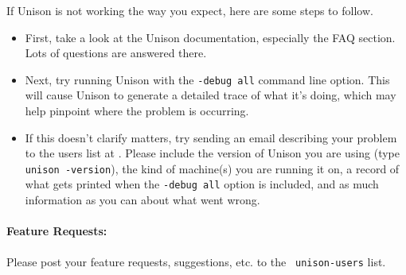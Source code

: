 If Unison is not working the way you expect, here are some steps to 
follow.
\begin{itemize}
\item First, take a look at the Unison documentation, especially the
FAQ section.  Lots of questions are answered there.

\item Next, try running Unison with the {\tt -debug all} command line
option.  This will cause Unison to generate a detailed trace of what it's
doing, which may help pinpoint where the problem is occurring.

\item If this doesn't clarify matters, try sending an email describing
your problem to the users list at
.  
Please include the version of Unison you are using (type {\tt unison
  -version}), the kind of machine(s) you are running it on, a record of
what gets printed when the {\tt -debug all} option is included, and as
much information as you can about what went wrong.
\end{itemize}

\paragraph{Feature Requests:}

Please post your feature requests, suggestions, etc. to the {\tt
  unison-users} list.   

